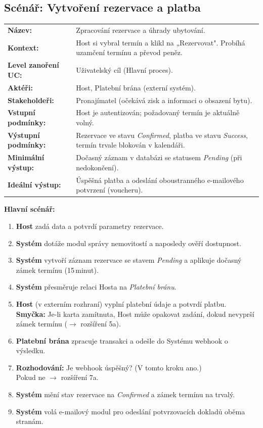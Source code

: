\documentclass[11pt, a4paper]{article}
\makeatletter
\newenvironment{scenparams}{%
  \par\vspace{0.1cm}%
  \noindent{\color{ruleblue}\rule{\textwidth}{0.8pt}}\nopagebreak%
  \vspace{2pt}\par\nopagebreak%
  \begin{tabular}{@{}p{4.7cm}@{\hspace{0.1cm}}p{\dimexpr\textwidth-5.0cm\relax}@{}}%
}{%
  \end{tabular}%
  \par\vspace{-2pt}%
  \noindent{\color{ruleblue}\rule{\textwidth}{0.8pt}}%
  \vspace{0.35cm}%
}
\newcommand{\sprow}[2]{\textbf{#1:} & #2 \\[3pt]}
\makeatother
\begin{document}
\newpage

\subsection{Scénář: Vytvoření rezervace a platba}

\begin{scenparams}
  \sprow{Název}{Zpracování rezervace a úhrady ubytování.}
  \sprow{Kontext}{Host si vybral termín a klikl na „Rezervovat". Probíhá uzamčení termínu a převod peněz.}
  \sprow{Level zanoření UC}{Uživatelský cíl (Hlavní proces).}
  \sprow{Aktéři}{Host, Platební brána (externí systém).}
  \sprow{Stakeholdeři}{Pronajímatel (očekává zisk a informaci o obsazení bytu).}
  \sprow{Vstupní podmínky}{Host je autentizován; požadovaný termín je aktuálně volný.}
  \sprow{Výstupní podmínky}{Rezervace ve stavu \textit{Confirmed}, platba ve stavu \textit{Success}, termín trvale blokován v kalendáři.}
  \sprow{Minimální výstup}{Dočasný záznam v databázi se statusem \textit{Pending} (při nedokončení).}
  \sprow{Ideální výstup}{Úspěšná platba a odeslání oboustranného e-mailového potvrzení (voucheru).}
\end{scenparams}

\textbf{Hlavní scénář:}
\begin{enumerate}
  \item \textbf{Host} zadá data a potvrdí parametry rezervace.
  \item \textbf{Systém} dotáže modul správy nemovitostí a naposledy ověří dostupnost.
  \item \textbf{Systém} vytvoří záznam rezervace se stavem \textit{Pending} a aplikuje dočasný zámek termínu (15\,minut).
  \item \textbf{Systém} přesměruje relaci Hosta na \textit{Platební bránu}.
  \item \textbf{Host} (v externím rozhraní) vyplní platební údaje a potvrdí platbu.\\
        \textbf{Smyčka:} Je-li karta zamítnuta, Host může opakovat zadání, dokud nevyprší zámek termínu ($\rightarrow$ rozšíření 5a).
  \item \textbf{Platební brána} zpracuje transakci a odešle do Systému webhook o výsledku.
  \item \textbf{Rozhodování:} Je webhook úspěšný? (V tomto kroku ano.)\\
        Pokud ne $\rightarrow$ rozšíření 7a.
  \item \textbf{Systém} mění stav rezervace na \textit{Confirmed} a zámek termínu na trvalý.
  \item \textbf{Systém} volá e-mailový modul pro odeslání potvrzovacích dokladů oběma stranám.
\end{enumerate}
\end{document}
